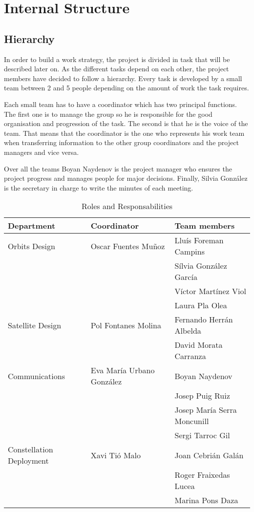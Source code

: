 \section{Internal Structure}


\subsection{Hierarchy}

In order to build a work strategy, the project is divided in task that will be described later on. As the different tasks depend on each other, the project members have decided to follow a hierarchy. Every task is developed by a small team between 2 and 5 people depending on the amount of work the task requires.
\newline

Each small team has to have a coordinator which has two principal functions. The first one is to manage the group so he is responsible for the good organisation and progression of the task. The second is that he is the voice of the team. That means that the coordinator is the one who represents his work team when transferring information to the other group coordinators and the project managers and vice versa.
\newline

Over all the teams Boyan Naydenov is the project manager who ensures the project progress and manages people for major decisions. Finally, Silvia González is the secretary in charge to write the minutes of each meeting. \newline
 
\begin{table}[h]
\begin{tabular}{ | l | l | p{5cm} |}
\hline
\textbf{Department} & \textbf{Coordinator} & \textbf{Team members} \\ \hline
Orbits Design & Oscar Fuentes Muñoz & Llu\'{i}s Foreman Campins\\ \hline
 & & S\'{i}lvia Gonz\'{a}lez Garc\'{i}a \\ \hline
 & & V\'{i}ctor Mart\'{i}nez Viol \\ \hline
 & & Laura Pla Olea \\ \hline
Satellite Design & Pol Fontanes Molina & Fernando Herr\'{a}n Albelda \\ \hline
 & & David Morata Carranza \\ \hline
Communications & Eva Mar\'{i}a Urbano Gonz\'{a}lez & Boyan Naydenov \\ \hline
 & & Josep Puig Ruiz \\ \hline
 & & Josep Mar\'{i}a Serra Moncunill \\ \hline
 & & Sergi Tarroc Gil \\ \hline
Constellation Deployment & Xavi Ti\'{o} Malo & Joan Cebri\'{a}n Gal\'{a}n \\ \hline
 & & Roger Fraixedas Lucea \\ \hline
 & & Marina Pons Daza \\ \hline

\end{tabular}
\caption{Roles and Responsabilities}
\end{table}
